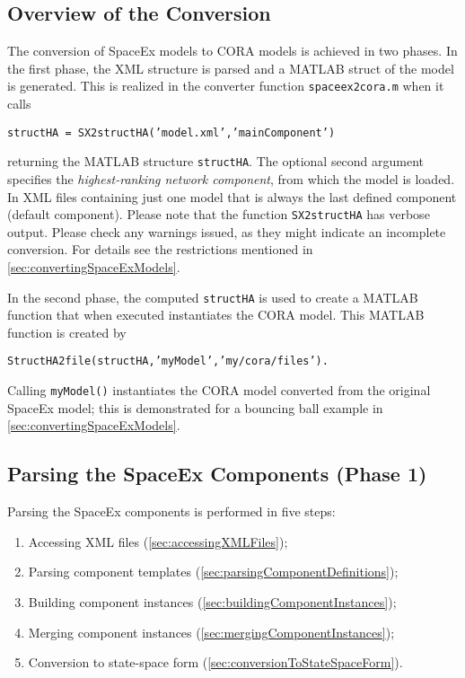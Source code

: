 \subsection{Overview of the Conversion} \label{sec:spaceExConversionOverview}

The conversion of SpaceEx models to CORA models is achieved in two phases. In the first phase, the XML structure is parsed and a MATLAB struct of the model is generated. This is realized in the converter function \texttt{spaceex2cora.m} when it calls

\texttt{structHA = SX2structHA('model.xml','mainComponent')} 

returning the MATLAB structure \texttt{structHA}. The optional second argument specifies the \textit{highest-ranking network component}, from which the model is loaded. In XML files containing just one model that is always the last defined component (default component). Please note that the function \texttt{SX2structHA} has verbose output. Please check any warnings issued, as they might indicate an incomplete conversion. For details see the restrictions mentioned in \cref{sec:convertingSpaceExModels}.

In the second phase, the computed \texttt{structHA} is used to create a MATLAB function that when executed instantiates the CORA model. This MATLAB function is created by

\texttt{StructHA2file(structHA,'myModel','my/cora/files').} 

Calling \texttt{myModel()} instantiates the CORA model converted from the original SpaceEx model; this is demonstrated for a bouncing ball example in \cref{sec:convertingSpaceExModels}.


\subsection{Parsing the SpaceEx Components (Phase 1)} \label{sec:parsingSpaceExComponents}

Parsing the SpaceEx components is performed in five steps:
\begin{enumerate}
 \item Accessing XML files (\cref{sec:accessingXMLFiles});
 \item Parsing component templates (\cref{sec:parsingComponentDefinitions});
 \item Building component instances (\cref{sec:buildingComponentInstances});
 \item Merging component instances (\cref{sec:mergingComponentInstances});
 \item Conversion to state-space form (\cref{sec:conversionToStateSpaceForm}).
\end{enumerate}

